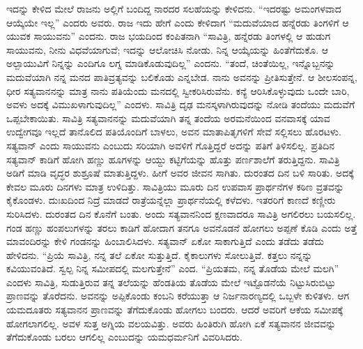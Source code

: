 \vskip 0.1cm

ಇದನ್ನು ಕೇಳಿದ ಮೇಲೆ ರಾಜನು ಅಲ್ಲಿಗೆ ಬಂದಿದ್ದ ನಾರದರ ಸಲಹೆಯನ್ನು ಕೇಳಿದನು. “ಇದರಷ್ಟು ಅಮಂಗಳವಾದ ಆಯ್ಕೆಯೇ ಇಲ್ಲ” ಎಂದರು ಅವರು. ರಾಜ ಇದು ಹೇಗೆ ಎಂದು ಕೇಳಿದಾಗ “ಮದುವೆಯಾದ ಹನ್ನೆರಡು ತಿಂಗಳಿಗೆ ಆ ಯುವಕ ಸಾಯುವನು” ಎಂದನು. ರಾಜ ಭಯದಿಂದ ಕಂಪಿತನಾಗಿ “ಸಾವಿತ್ರಿ, ಹನ್ನೆರಡು ತಿಂಗಳಲ್ಲಿ ಆ ಹುಡುಗ ಸಾಯುವನು, ನೀನು ವಿಧವೆಯಾಗುವೆ; ಇದನ್ನು ಆಲೋಚಿಸಿ ನೋಡು. ನಿನ್ನ ಆಯ್ಕೆಯನ್ನು ಹಿಂತೆಗೆದುಕೊ. ಆ ಅಲ್ಪಾಯುವಿಗೆ ನಿನ್ನನ್ನು ಎಂದಿಗೂ ಲಗ್ನ ಮಾಡಿಕೊಡುವುದಿಲ್ಲ” ಎಂದನು. “ತಂದೆ, ಚಿಂತೆಯಿಲ್ಲ, ಇನ್ನೊಬ್ಬನನ್ನು ಮದುವೆಯಾಗಿ ನನ್ನ ಮನದ ಪಾತಿವ್ರತ್ಯವನ್ನು ಬಲಿಕೊಡು ಎನ್ನಬೇಡ. ನಾನು ಅವನನ್ನು ಪ್ರೀತಿಸುತ್ತೇನೆ. ಆ ಶೀಲಸಂಪನ್ನ, ಧೀರ ಸತ್ಯವಾನನನ್ನು ಮಾತ್ರ ನಾನು ಪತಿಯೆಂದು ಮನದಲ್ಲಿ ಸ್ವೀಕರಿಸಿರುವೆನು. ಕನ್ಯೆ ಆರಿಸಿಕೊಳ್ಳುವುದು ಒಂದೇ ಬಾರಿ, ಅವಳು ಅದಕ್ಕೆ ವಿಮುಖಳಾಗುವುದಿಲ್ಲ” ಎಂದಳು. ಸಾವಿತ್ರಿ ದೃಢ ಮನಸ್ಕಳಾಗಿರುವುದನ್ನು ನೋಡಿ ತಂದೆಯು ಮದುವೆಗೆ ಒಪ್ಪಬೇಕಾಯಿತು. ಸಾವಿತ್ರಿ ಸತ್ಯವಾನನನ್ನು ಮದುವೆಯಾಗಿ ತನ್ನ ತಂದೆಯ ಅರಮನೆಯಿಂದ ವನವಾಸಕ್ಕೆ ಯಾವ ಉದ್ವೇಗವೂ ಇಲ್ಲದೆ ತಾನೊಲಿದ ಪತಿಯೊಂದಿಗೆ ಬಾಳಲು, ಅವನ ಮಾತಾಪಿತೃಗಳಿಗೆ ಸೇವೆ ಸಲ್ಲಿಸಲು ಹೊರಟಳು. ಸತ್ಯವಾನ್​ ಎಂದು ಸಾಯುವನು ಎಂಬುದು ಸರಿಯಾಗಿ ಅವಳಿಗೆ ಗೊತ್ತಿದ್ದರೆ ಅದನ್ನು ಪತಿಗೆ ತಿಳಿಸಲಿಲ್ಲ. ಪ್ರತಿದಿನ ಸತ್ಯವಾನ್​ ಕಾಡಿಗೆ ಹೋಗಿ ಹಣ್ಣು ಹೂಗಳನ್ನು ಆಯ್ದು ಕಟ್ಟಿಗೆಯನ್ನು ಹೊತ್ತು ಪರ್ಣಶಾಲೆಗೆ ತರುತ್ತಿದ್ದನು. ಸಾವಿತ್ರಿ ಅಡಿಗೆ ಮಾಡಿ ವೃದ್ಧರ ಶುಶ್ರೂಷೆ ಮಾತುತ್ತಿದ್ದಳು. ಹೀಗೆ ಅವರ ಜೀವನ ಸಾಗಿತು. ದುರಂತದ ದಿನ ಬಳಿ ಸಾರಿತು. ಅದಕ್ಕೆ ಕೇವಲ ಮೂರು ದಿನಗಳು ಮಾತ್ರ ಉಳಿದಿತ್ತು. ಸಾವಿತ್ರಿಯು ಮೂರು ದಿನ ಉಪವಾಸ ಪ್ರಾರ್ಥನೆಗಳ ಕಠಿಣ ವ್ರತವನ್ನು ಕೈಕೊಂಡಳು. ದುಃಖದಿಂದ ನಿದ್ರೆ ಮಾಡದೆ ರಾತ್ರೆಯನ್ನೆಲ್ಲಾ ಪ್ರಾರ್ಥನೆಯಲ್ಲಿ ಕಳೆದಳು. ಇತರರಿಗೆ ಕಾಣದೆ ಕಣ್ಣೀರು ಸುರಿಸಿದಳು. ದುರಂತದ ದಿನ ಕೊನೆಗೆ ಬಂತು. ಅಂದು ಸತ್ಯವಾನನಿಂದ ಕ್ಷಣವಾದರೂ ಸಾವಿತ್ರಿ ಅಗಲಿರಲು ಬಯಸಲಿಲ್ಲ. ಗಂಡ ಹಣ್ಣು ಹಂಪಲುಗಳನ್ನು ತರಲು ಕಾಡಿಗೆ ಹೋದಾಗ ತನಗೂ ಅವನೊಡನೆ ಹೋಗಲು ಅಪ್ಪಣೆ ಕೊಡಿ ಎಂದು ಅತ್ತೆ ಮಾವಂದಿರನ್ನು ಕೇಳಿ ಗಂಡನನ್ನು ಹಿಂಬಾಲಿಸಿದಳು. ಸತ್ಯವಾನ್​ ಏಕೋ ಸಾಕಾಗುತ್ತಿದೆ ಎಂದು ತಡೆದು ತಡೆದು ಹೇಳಿದನು. “ಪ್ರಿಯೆ ಸಾವಿತ್ರಿ, ನನ್ನ ತಲೆ ಏಕೋ ಸುತ್ತುತ್ತಿದೆ. ಕೈಕಾಲುಗಳು ಸೋಲುತ್ತಿವೆ. ಕತ್ತಲು ನನ್ನನ್ನು ಕವಿಯುವಂತಿದೆ. ಸ್ವಲ್ಪ ನಿನ್ನ ಸಮೀಪದಲ್ಲಿ ಮಲಗುತ್ತೇನೆ” ಎಂದ. “ಪ್ರಿಯತಮ, ನನ್ನ ತೊಡೆಯ ಮೇಲೆ ಮಲಗಿ” ಎಂದಳು ಸಾವಿತ್ರಿ, ಸುಡುತ್ತಿರುವ ತನ್ನ ತಲೆಯನ್ನು ಹೆಂಡತಿಯ ತೊಡೆಯ ಮೇಲೆ ಇಟ್ಟೊಡನೆಯೆ ನಿಟ್ಟುಸಿರುಬಿಟ್ಟು ಪ್ರಾಣವನ್ನು ತೊರೆದನು. ಅವನನ್ನು ಅಪ್ಪಿಕೊಂಡು ಕಂಬನಿ ಕರೆಯುತ್ತಾ ಆ ನಿರ್ಜನಾರಣ್ಯದಲ್ಲಿ ಒಬ್ಬಳೇ ಕುಳಿತಳು. ಆಗ ಯಮದೂತರು ಸತ್ಯವಾನನ ಪ್ರಾಣವನ್ನು ತೆಗೆದುಕೊಂಡು ಹೋಗಲು ಬಂದರು. ಆದರೆ ಅವರಿಗೆ ಆಕೆಯ ಸಮೀಪಕ್ಕೆ ಹೋಗಲಾಗಲಿಲ್ಲ. ಅವಳ ಸುತ್ತ ಅಗ್ನಿಯ ವಲಯವಿತ್ತು. ಅವರು ಹಿಂತಿರುಗಿ ಹೋಗಿ ಏಕೆ ಸತ್ಯವಾನನ ಜೀವವನ್ನು ತೆಗೆದುಕೊಂಡು ಬರಲು ಆಗಲಿಲ್ಲ ಎಂಬುದನ್ನು ಯಮಧರ್ಮನಿಗೆ ವಿವರಿಸಿದರು.

\vskip 0.1cm

